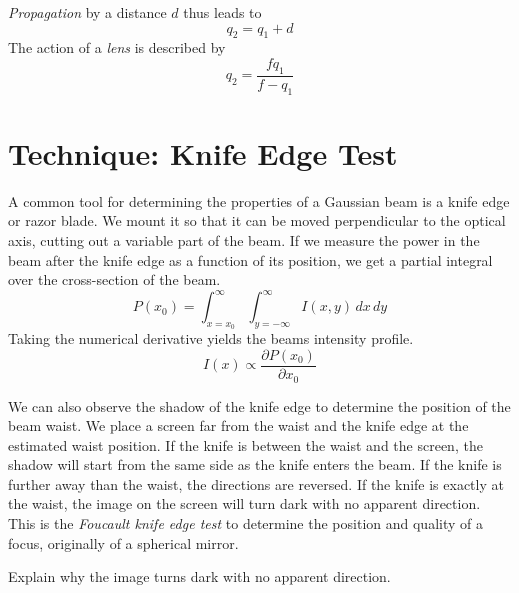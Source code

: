\emph{Propagation} by a distance $d$ thus leads to 
\begin{equation}
    q_2 = q_1 + d
\end{equation}
The action of a \emph{lens} is described by
\begin{equation}
    q_2 = \frac{f q_1}{f - q_1}
\end{equation}




\section{Technique: Knife Edge Test}


A common tool for determining the properties of a Gaussian beam is a knife edge or razor blade. We mount it so that it can be moved perpendicular to the optical axis, cutting out a variable part of the beam. If we measure the power in the beam after the knife edge as a function of its position, we get a partial integral over the cross-section of the beam.
\begin{equation}
    P(x_0) = \int_{x=x_0}^\infty \int_{y=-\infty}^\infty I(x,y) \, dx \, dy
\end{equation}
Taking the numerical derivative yields the beams intensity profile.
\begin{equation}
    I(x) \propto \frac{\partial P(x_0)}{\partial x_0}
\end{equation}


We can also observe the shadow of the knife edge to determine the position of the beam waist. We place a screen far from the waist and the knife edge at the estimated waist position. If the knife is between the waist and the screen, the shadow will start from the same side as the knife enters the beam. If the knife is further away than the waist, the directions are reversed. If the knife is exactly at the waist, the image on the screen will turn dark with no apparent direction. This is the \emph{Foucault knife edge test} to determine the position and quality of a focus, originally of a spherical mirror.

\begin{questions}
    \item Explain why the image turns dark with no apparent direction.
\end{questions}

\printbibliography[segment=\therefsegment,heading=subbibliography]
